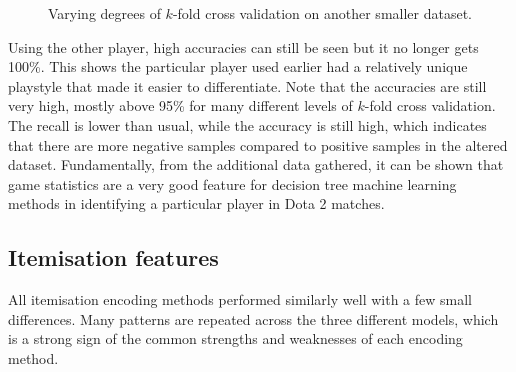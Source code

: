 \documentclass[Report.tex]{subfiles}
\begin{document}
\renewcommand{\rfplotbar}[2] {
\addplot+[mark=none] table [x=cv, y=#1, col sep=comma] {data/14-game-rf.csv};
\addlegendentry{#2}
}
\begin{figure}[H]
\caption{Varying degrees of $k$-fold cross validation on another smaller dataset.}
\end{figure}

Using the other player, high accuracies can still be seen but it no longer gets 100\%. This shows the particular player used earlier had a relatively unique playstyle that made it easier to differentiate. Note that the accuracies are still very high, mostly above 95\% for many different levels of $k$-fold cross validation. The recall is lower than usual, while the accuracy is still high, which indicates that there are more negative samples compared to positive samples in the altered dataset. Fundamentally, from the additional data gathered, it can be shown that game statistics are a very good feature for decision tree machine learning methods in identifying a particular player in Dota 2 matches. 



\subsection{Itemisation features}

All itemisation encoding methods performed similarly well with a few small differences. Many patterns are repeated across the three different models, which is a strong sign of the common strengths and weaknesses of each encoding method. 
\end{document}
